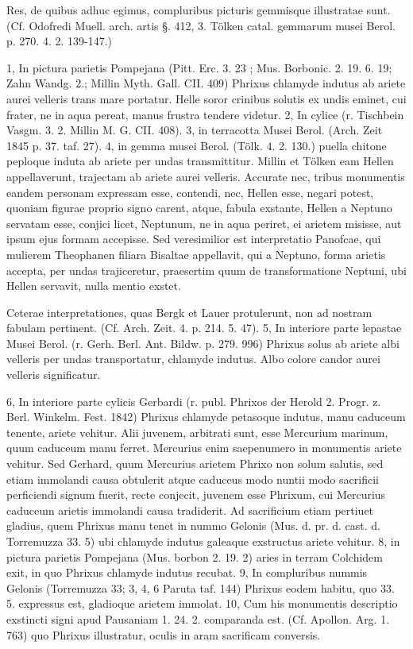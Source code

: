 \documentclass[landscape, a4paper, 11pt, oneside, polutonikogreek, german]{article}
\begin{document}
Res, de quibus adhuc egimus, compluribus picturis gemmisque illustratae sunt. (Cf. Odofredi Muell. arch. artis §. 412, 3. Tölken catal. gemmarum musei Berol. p. 270. 4. 2. 139-147.)

1, In pictura parietis Pompejana (Pitt. Erc. 3. 23 ; Mus. Borbonic. 2. 19. 6. 19; Zahn Wandg. 2.; Millin Myth. Gall. CII. 409) Phrixus chlamyde indutus ab ariete aurei velleris trans mare portatur. Helle soror crinibus solutis ex undis eminet, cui frater, ne in aqua pereat, manus frustra tendere videtur. 2, In cylice (r. Tischbein Vasgm. 3. 2. Millin M. G. CII. 408). 3, in terracotta Musei Berol. (Arch. Zeit 1845 p. 37. taf. 27). 4, in gemma musei Berol. (Tölk. 4. 2. 130.) puella chitone peploque induta ab ariete per undas transmittitur. Millin et Tölken eam Hellen appellaverunt, trajectam ab ariete aurei velleris. Accurate nec, tribus monumentis eandem personam expressam esse, contendi, nec, Hellen esse, negari potest, quoniam figurae proprio signo carent, atque, fabula exstante, Hellen a Neptuno servatam esse, conjici licet, Neptunum, ne in aqua periret, ei arietem misisse, aut ipsum ejus formam accepisse. Sed veresimilior est interpretatio Panofcae, qui mulierem Theophanen filiara Bisaltae appellavit, qui a Neptuno, forma arietis accepta, per undas trajiceretur, praesertim quum de transformatione Neptuni, ubi Hellen servavit, nulla mentio exstet.

Ceterae interpretationes, quas Bergk et Lauer protulerunt, non ad nostram fabulam pertinent. (Cf. Arch. Zeit. 4. p. 214. 5. 47). 5, In interiore parte lepastae Musei Berol. (r. Gerh. Berl. Ant. Bildw. p. 279. 996) Phrixus solus ab ariete albi velleris per undas transportatur, chlamyde indutus. Albo colore candor aurei velleris significatur.

6, In interiore parte cylicis Gerbardi (r. publ. Phrixos der Herold 2. Progr. z. Berl. Winkelm. Fest. 1842) Phrixus chlamyde petasoque indutus, manu caduceum tenente, ariete vehitur. Alii juvenem, arbitrati sunt, esse Mercurium marinum, quum caduceum manu ferret. Mercurius enim saepenumero in monumentis ariete vehitur. Sed Gerhard, quum Mercurius arietem Phrixo non solum salutis, sed etiam immolandi causa obtulerit atque caduceus modo nuntii modo sacrificii perficiendi signum fuerit, recte conjecit, juvenem esse Phrixum, cui Mercurius caduceum arietis immolandi causa tradiderit. Ad sacrificium etiam pertiuet gladius, quem Phrixus manu tenet in nummo Gelonis (Mus. d. pr. d. cast. d. Torremuzza 33. 5) ubi chlamyde indutus galeaque exstructus ariete vehitur. 8, in pictura parietis Pompejana (Mus. borbon 2. 19. 2) aries in terram Colchidem exit, in quo Phrixus chlamyde indutus recubat. 9, In compluribus nummis Gelonis (Torremuzza 33; 3, 4, 6 Paruta taf. 144) Phrixus eodem habitu, quo 33. 5. expressus est, gladioque arietem immolat. 10, Cum his monumentis descriptio exstincti signi apud Pausaniam 1. 24. 2. comparanda est. (Cf. Apollon. Arg. 1. 763) quo Phrixus illustratur, oculis in aram sacrificam conversis.
\end{document}
